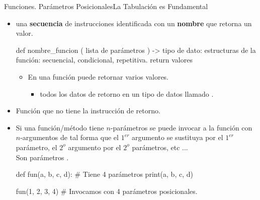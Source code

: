 \documentclass[10pt,envcountsect,spanish]{beamer}
\begin{document}
\begin{frame}[fragile]{Funciones. Parámetros Posicionales}{La Tabulación es Fundamental}
\begin{itemize}
\item  {} una \textbf{secuencia} de instrucciones identificada con un \textbf{nombre} que retorna un valor. 

\hfil
\begin{minipage}{.94\textwidth}
{\footnotesize
\begin{pyverbatim}[][frame=single]
def nombre_funcion ( lista de parámetros ) -> tipo de dato:  
   estructuras de la función: secuencial, condicional, repetitiva.
   return valores 
\end{pyverbatim}
}
\end{minipage}

\begin{itemize}
\item[] En  una función puede retornar varios valores.
	\begin{itemize} 
	\item {} todos los datos de retorno en un tipo de datos llamado . 
	\end{itemize}
\end{itemize}

\item {} Función que no tiene la instrucción de retorno.

\item Si una función/método tiene $n$-parámetros se puede invocar a la función con $n$-argumentos de tal forma que el $1^{er}$ argumento se sustituya por el $1^{er}$ parámetro, el $2^{o}$ argumento por el $2^{o}$ parámetros, etc ... \\
\hfil Son parámetros .

{\footnotesize
\begin{pyverbatim}[][frame=single]
def fun(a, b, c, d):  # Tiene 4 parámetros
    print(a, b, c, d)

fun(1, 2, 3, 4) # Invocamos con 4 parámetros posicionales.
\end{pyverbatim}
}

\end{itemize}
\end{frame}
\end{document}
